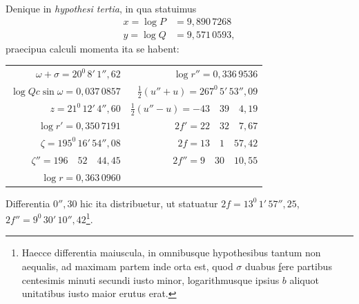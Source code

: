 Denique in \textit{hypothesi tertia}, in qua statuimus
\[
\begin{aligned}
x=\log P&=9{,}890\,7268\\
y=\log Q&=9{,}571\,0593,
\end{aligned}
\]
\noindent praecipua calculi momenta ita se habent:
\begin{center}\begingroup\footnotesize\setlength{\tabcolsep}{6pt}\renewcommand{\arraystretch}{1.3}
\begin{tabular}{r|r}
$\omega+\sigma=20^0\,8'\,1''{,}62$ & $\log r''=0{,}336\,9536$\\
$\log Qc\sin\omega=0{,}037\,0857$ & $\tfrac12(u''+u)=267^0\,5'\,53''{,}09$\\
$z=21^0\,12'\,4''{,}60$ & $\tfrac12(u''-u)=-43\quad39\quad4{,}19$\\
$\log r'=0{,}350\,7191$ & $2f'=22\quad32\quad7{,}67$\\
$\zeta=195^0\,16'\,54''{,}08$ & $2f=13\quad1\quad57{,}42$\\
$\zeta''=196\quad52\quad44{,}45$ & $2f''=9\quad30\quad10{,}55$\\
$\log r=0{,}363\,0960$ &
\end{tabular}\endgroup\end{center}
\noindent{}Differentia $0''{,}30$ hic ita distribuetur, ut statuatur $2f=13^0\,1'\,57''{,}25$, $2f''=9^0\,30'\,10''{,}42$\footnote{Haecce differentia maiuscula, in omnibusque hypothesibus tantum non aequalis, ad maximam partem inde orta est, quod $\sigma$ duabus \underline{f}ere partibus centesimis minuti secundi iusto minor, logarithmusque ipsius $b$ aliquot unitatibus iusto maior erutus erat.}.

